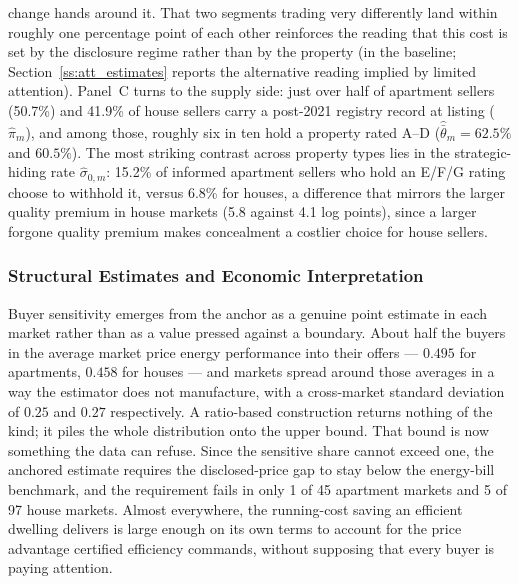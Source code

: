 change hands around it. That two segments trading very differently land within roughly one percentage point
of each other reinforces the reading that this cost is set by the disclosure regime rather than
by the property (in the baseline; Section~\ref{ss:att_estimates} reports the alternative reading implied by limited attention). Panel~C
turns to the supply side: just over half of apartment sellers (50.7\%) and 41.9\% of house
sellers carry a post-2021 registry record at listing ($\hat\pi_m$), and among those, roughly
six in ten hold a property rated A--D ($\hat{\bar\theta}_m = 62.5\%$ and $60.5\%$).
The most striking contrast across property types lies in the strategic-hiding rate
$\hat\sigma_{0,m}$: 15.2\% of informed apartment sellers who hold an E/F/G rating choose to
withhold it, versus 6.8\% for houses, a difference that mirrors the larger quality premium in
house markets (5.8 against 4.1 log points), since a larger forgone quality premium makes concealment
a costlier choice for house sellers.

\subsubsection{Structural Estimates and Economic Interpretation}

Buyer sensitivity emerges from the anchor as a genuine point estimate in each market rather than
as a value pressed against a boundary. About half the buyers in the average market price energy
performance into their offers --- $0.495$ for apartments, $0.458$ for houses --- and markets
spread around those averages in a way the estimator does not manufacture, with a cross-market
standard deviation of $0.25$ and $0.27$ respectively. A ratio-based construction returns nothing
of the kind; it piles the whole distribution onto the upper bound. That bound is now something
the data can refuse. Since the sensitive share cannot exceed one, the anchored estimate requires
the disclosed-price gap to stay below the energy-bill benchmark, and the requirement fails in
only 1 of 45 apartment markets and 5 of 97 house markets. Almost everywhere, the running-cost
saving an efficient dwelling delivers is large enough on its own terms to account for the price
advantage certified efficiency commands, without supposing that every buyer is paying attention.

